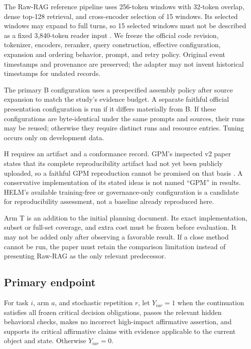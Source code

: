 The Raw-RAG reference pipeline uses 256-token windows with 32-token
overlap, dense top-128 retrieval, and cross-encoder selection of 15
windows. Its selected windows may expand to full turns, so 15 selected
windows must not be described as a fixed 3,840-token reader input
\citep{bao2026rawrag}. We freeze the official code revision, tokenizer,
encoders, reranker, query construction, effective configuration,
expansion and ordering behavior, prompt, and retry policy. Original
event timestamps and provenance are preserved; the adapter may not
invent historical timestamps for undated records.

The primary B configuration uses a prespecified assembly policy after
source expansion to match the study's evidence budget. A separate
faithful official presentation configuration is run if it differs
materially from B. If these configurations are byte-identical under the
same prompts and sources, their runs may be reused; otherwise they
require distinct runs and resource entries. Tuning occurs only on
development data.

H requires an artifact and a conformance record. GPM's inspected v2
paper states that its complete reproducibility artifact had not yet been
publicly uploaded, so a faithful GPM reproduction cannot be promised on
that basis \citep{xu2026gpm}. A conservative implementation of its
stated ideas is not named ``GPM'' in results. HELM's available
training-free or governance-only configuration is a candidate for
reproducibility assessment, not a baseline already reproduced here.

Arm T is an addition to the initial planning document. Its exact
implementation, subset or full-set coverage, and extra cost must be
frozen before evaluation. It may not be added only after observing a
favorable result. If a close method cannot be run, the paper must retain
the comparison limitation instead of presenting Raw-RAG as the only
relevant predecessor.

\subsection{Primary endpoint}\label{primary-endpoint}

For task \(i\), arm \(a\), and stochastic repetition \(r\), let
\(Y_{iar}=1\) when the continuation satisfies all frozen critical
decision obligations, passes the relevant hidden behavioral checks,
makes no incorrect high-impact affirmative assertion, and supports its
critical affirmative claims with evidence applicable to the current
object and state. Otherwise \(Y_{iar}=0\).

